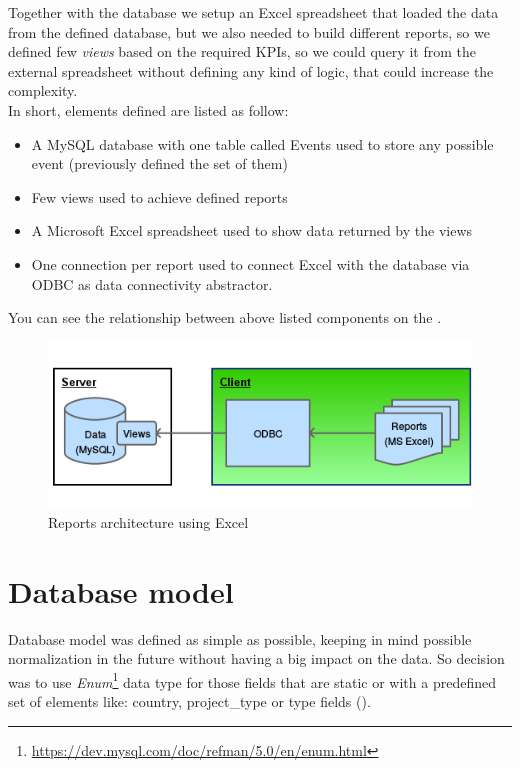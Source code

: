Together with the database  we setup an Excel spreadsheet that loaded
the data from the defined database, but  we also needed to build different
reports, so we defined few \emph{views} based  on the required KPIs, so we could
query it from the external spreadsheet  without defining any kind of logic,
that could increase the complexity.\\ 

In short, elements defined are listed as follow:
\begin{itemize}
  \item A MySQL database with one table called Events used to store any possible
  event (previously defined the set of them)
  \item Few views used to achieve defined reports
  \item A Microsoft Excel spreadsheet used to show data returned by the views
  \item One connection per report used to connect Excel with the database
  via ODBC as data connectivity abstractor. 
\end{itemize}

You can see the relationship between above listed components on the 
.
 
\begin{figure}[ht!]
	\centering
   	\includegraphics[width=1\textwidth]{./resources/excel_architecture.png}
   	\caption{Reports architecture using Excel}
   	\label{f_excel_architecture}
\end{figure}

\section{Database model}
Database model was defined as simple as possible, keeping in mind
possible normalization in the future without having a big impact on the data. So
decision was to use
\emph{Enum}\footnote{\url{https://dev.mysql.com/doc/refman/5.0/en/enum.html}}
data type for those fields that are static or with a predefined set of
elements like: country, project\_type or  type fields
().

